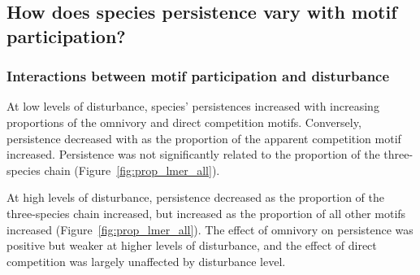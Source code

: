 \documentclass[12pt]{article}
\begin{document}
\begin{spacing}{2.0}
    \clearpage

    \subsection*{How does species persistence vary with motif participation?} 
    
    
        \subsubsection*{Interactions between motif participation and disturbance}
        
            At low levels of disturbance, species' persistences increased with increasing proportions of the omnivory and direct competition motifs. Conversely, persistence decreased with as the  proportion of the apparent competition motif increased. Persistence was not significantly related to the proportion of the three-species chain (Figure~\ref{fig:prop_lmer_all}).
            
            At high levels of disturbance, persistence decreased as the proportion of the three-species chain increased, but increased as the proportion of all other motifs increased (Figure~\ref{fig:prop_lmer_all}).
            The effect of omnivory on persistence was  positive but weaker at higher levels of disturbance, and the effect of direct competition was largely unaffected by disturbance level.
    

\end{spacing}
\end{document}
